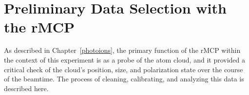 %



\section{Preliminary Data Selection with the rMCP}
\label{sec:rmcp_cuts}
As described in Chapter~\ref{photoions}, the primary function of the rMCP within the context of this experiment is as a probe of the atom cloud, and it provided a critical check of the cloud's position, size, and polarization state over the course of the beamtime.  The process of cleaning, calibrating, and analyzing this data is described here.  

